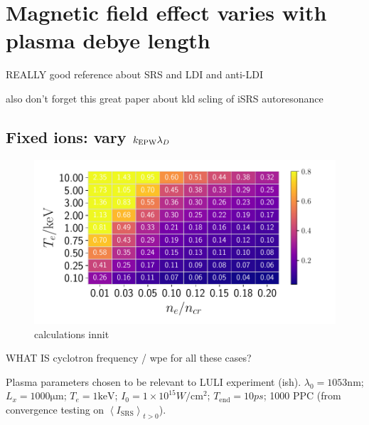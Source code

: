 \section{Magnetic field effect varies with plasma debye length}

\citep{Feng2018} REALLY good reference about SRS and LDI and anti-LDI

also don't forget this great paper about kld scling of iSRS autoresonance \citep{Chapman2013}

\subsection{Fixed ions: vary $k_\mathrm{EPW}\lambda_D$}

\begin{figure}[ht]
   \centering
    \includegraphics[width=\columnwidth]{Chapters/C6_magSRS/kld_scan_ben_simon.pdf}
    \caption{calculations innit}
    \label{fig:kld_scan}
\end{figure}{}

WHAT IS cyclotron frequency / wpe for all these cases?

Plasma parameters chosen to be relevant to LULI experiment (ish). $\lambda_0 = 1053 \si{\nano\metre}$; $L_x = 1000 \si{\micro\metre}$; $T_e = 1 \si{\kilo\electronvolt}$; $I_0 = 1\times 10^{15}\si{W/\cm^2}$; $T_{\mathrm{end}}=10 \si{ps}$; 1000 PPC (from convergence testing on $\left< I_{\mathrm{SRS}} \right>_{t>0}$).

